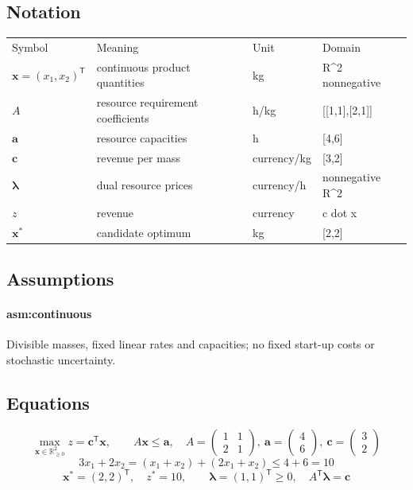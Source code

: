 \subsection*{Notation}
\begin{tabular}{llll}
Symbol & Meaning & Unit & Domain \\
$\mathbf x=(x_1,x_2)^{\mathsf T}$ & continuous product quantities & kg & R^2 nonnegative \\
$A$ & resource requirement coefficients & h/kg & [[1,1],[2,1]] \\
$\mathbf a$ & resource capacities & h & [4,6] \\
$\mathbf c$ & revenue per mass & currency/kg & [3,2] \\
$\boldsymbol\lambda$ & dual resource prices & currency/h & nonnegative R^2 \\
$z$ & revenue & currency & c dot x \\
$\mathbf x^*$ & candidate optimum & kg & [2,2] \\
\end{tabular}
\subsection*{Assumptions}
\paragraph{asm:continuous} Divisible masses, fixed linear rates and capacities; no fixed start-up costs or stochastic uncertainty.
\subsection*{Equations}
\begin{equation}
\max_{\mathbf x\in\mathbb R_{\ge0}^2} z=\mathbf c^{\mathsf T}\mathbf x,\qquad A\mathbf x\le\mathbf a,\quad A=\begin{pmatrix}1&1\\2&1\end{pmatrix},\ \mathbf a=\begin{pmatrix}4\\6\end{pmatrix},\ \mathbf c=\begin{pmatrix}3\\2\end{pmatrix}
\label{eq:lp-primal}
\end{equation}
\begin{equation}
3x_1+2x_2=(x_1+x_2)+(2x_1+x_2)\le 4+6=10
\label{eq:lp-bound}
\end{equation}
\begin{equation}
\boxed{\mathbf x^*=(2,2)^{\mathsf T},\quad z^*=10},\qquad \boldsymbol\lambda=(1,1)^{\mathsf T}\ge0,\quad A^{\mathsf T}\boldsymbol\lambda=\mathbf c
\label{eq:lp-certificate}
\end{equation}
